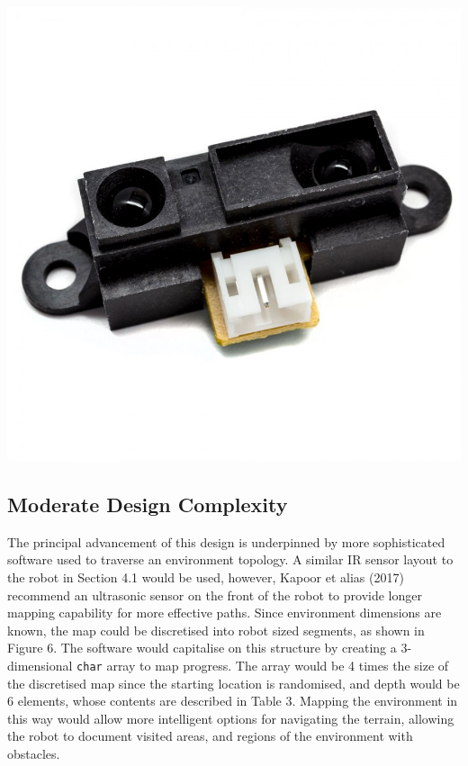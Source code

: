 \documentclass[a4paper]{article}
\begin{document}
\begin{center}
\includegraphics[scale=0.1]{sensor_1_2}
\end{center}


\newpage

\subsection{Moderate Design Complexity}
The principal advancement of this design is underpinned by more sophisticated software used to traverse an environment topology. A similar IR sensor layout to the robot in Section 4.1 would be used, however, Kapoor et alias (2017) recommend an ultrasonic sensor on the front of the robot to provide longer mapping capability for more effective paths. Since environment dimensions are known, the map could be discretised into robot sized segments, as shown in Figure 6. The software would capitalise on this structure by creating a 3-dimensional \verb|char| array to map progress. The array would be 4 times the size of the discretised map since the starting location is randomised, and depth would be 6 elements, whose contents are described in Table 3. Mapping the environment in this way would allow more intelligent options for navigating the terrain, allowing the robot to document visited areas, and regions of the environment with obstacles.
\end{document}

